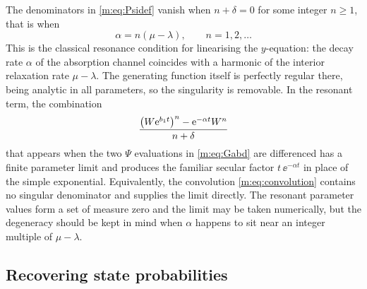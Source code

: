 \begin{remark}[Resonance]
\label{m:rem:resonance}
The denominators in \cref{m:eq:Psidef} vanish when $n+\delta=0$ for some
integer $n\ge1$, that is when
\begin{equation*}
\alpha = n(\mu-\lambda),\qquad n=1,2,\dots
\end{equation*}
This is the classical resonance condition for linearising the $y$-equation: the
decay rate $\alpha$ of the absorption channel coincides with a harmonic of the
interior relaxation rate $\mu-\lambda$. The generating function itself is
perfectly regular there, being analytic in all parameters, so the singularity
is removable. In the resonant term, the combination
\begin{equation*}
\frac{\left(W\mathrm{e}^{b_1t}\right)^{n} - \mathrm{e}^{-\alpha t}W^n}{n+\delta}
\end{equation*}
that appears when the two $\Psi$ evaluations in \cref{m:eq:Gabd} are
differenced has a finite parameter limit and produces the familiar secular
factor $t\,\ee^{-\alpha t}$ in place of the simple exponential. Equivalently,
the convolution \cref{m:eq:convolution} contains no singular denominator and
supplies the limit directly. The resonant parameter values form a set of
measure zero and the limit may be taken numerically, but the degeneracy should
be kept in mind when $\alpha$ happens to sit near an integer multiple of
$\mu-\lambda$.
\end{remark}

\subsection{Recovering state probabilities}
\label{m:sec:recovery}

